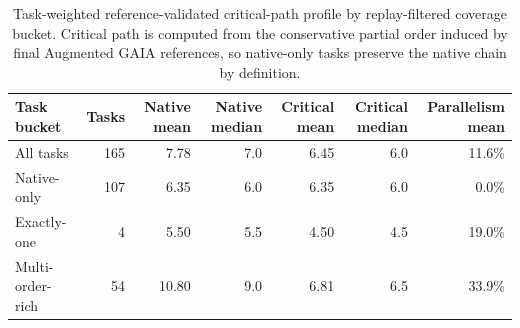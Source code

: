 \documentclass{article}
\begin{document}
\begin{table}[H]
\centering
\scriptsize
\setlength{\tabcolsep}{8pt}
\begin{tabular}{lrrrrrr}
\toprule
Task bucket & Tasks & Native mean & Native median & Critical mean & Critical median & Parallelism mean \\
\midrule
All tasks & 165 & 7.78 & 7.0 & 6.45 & 6.0 & 11.6\% \\
Native-only & 107 & 6.35 & 6.0 & 6.35 & 6.0 & 0.0\% \\
Exactly-one & 4 & 5.50 & 5.5 & 4.50 & 4.5 & 19.0\% \\
Multi-order-rich & 54 & 10.80 & 9.0 & 6.81 & 6.5 & 33.9\% \\
\bottomrule
\end{tabular}
\caption{Task-weighted reference-validated critical-path profile by replay-filtered coverage bucket. Critical path is computed from the conservative partial order induced by final Augmented GAIA references, so native-only tasks preserve the native chain by definition.}
\label{tab:appendix-critical-path-buckets}
\end{table}

\begin{table}[H]
\centering
\scriptsize
\setlength{\tabcolsep}{3.2pt}
\vspace{0.05cm}
\caption{Reference-validated critical-path and reordering diagnostic over Gemma 4-retained non-native async-ordering thresholds. Parallelism is computed from the final Augmented GAIA reference orderings; Kendall distance is computed between each retained reference ordering and the native chain.}
\label{tab:appendix-critical-path}
\end{table}
\end{document}
